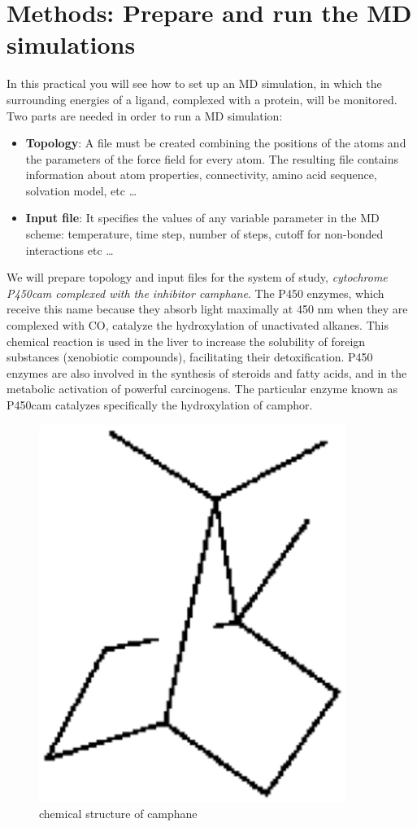 \documentclass[a4paper,12pt]{article}
\newcommand{\sctn}[1]{\section{\large #1}}
\begin{document}
%
%
\sctn{Methods: Prepare and run the MD simulations}
In this practical you will see how to set up an MD simulation, in which the surrounding energies of a ligand, complexed with a protein, will be monitored.\\
Two parts are needed in order to run a MD simulation:
\begin {itemize}
\item {\bf Topology}: A file must be created combining the positions of the atoms and the parameters of the force field for every atom. The resulting file contains information about atom properties, connectivity, amino acid sequence, solvation model, etc \ldots
\item {\bf Input file}: It specifies the values of any variable parameter in the MD scheme: temperature, time step, number of steps, cutoff for non-bonded interactions etc \ldots
\end {itemize}
We will prepare topology and input files for the system of study, {\it cytochrome P450cam complexed with the inhibitor camphane}. The P450 enzymes, which receive this name because they absorb light maximally at 450 nm when they are complexed with CO, catalyze the hydroxylation of unactivated alkanes. This chemical reaction is used in the liver to increase the solubility of foreign substances (xenobiotic compounds), facilitating their detoxification. P450 enzymes are also involved in the synthesis of steroids and fatty acids, and in the metabolic activation of powerful carcinogens. The particular enzyme known as P450cam catalyzes specifically the hydroxylation of camphor.\\
\begin{figure}[!ht]
\begin{center}
\includegraphics[width=10cm]{cam}
\caption{\label{cam} chemical structure of camphane}
\end{center}
\end{figure}
\end{document}
